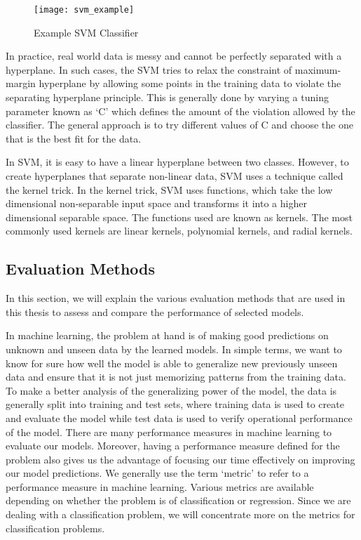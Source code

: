 \documentclass[11pt,openright]{report}
\begin{document}
  \begin{figure}
	\centering
	\texttt{[image: svm\_example]}
	\caption{Example SVM Classifier}
	\label{fig:svm_example}
\end{figure} 

In practice, real world data is messy and cannot be perfectly separated with a hyperplane. In such cases, the SVM tries to relax the constraint of maximum-margin hyperplane by allowing some points in the training data to violate the separating hyperplane principle. This is generally done by varying a tuning parameter known as `C' which defines the amount of the violation allowed by the classifier. The general approach is to try different values of C and choose the one that is the best fit for the data.

In SVM, it is easy to have a linear hyperplane between two classes. However, to create hyperplanes that separate non-linear data, SVM uses a technique called the kernel trick. In the kernel trick, SVM uses functions, which take the low dimensional non-separable input space and transforms it into a higher dimensional separable space. The functions used are known as kernels. The most commonly used kernels are linear kernels, polynomial kernels, and radial kernels. 

\subsection {Evaluation Methods}
In this section, we will explain the various evaluation methods that are used in this thesis to assess and compare the performance of selected models.

In machine learning, the problem at hand is of making good predictions on unknown and unseen data by the learned models. In simple terms, we want to know for sure how well the model is able to generalize new previously unseen data and ensure that it is not just memorizing patterns from the training data. To make a better analysis of the generalizing power of the model, the data is generally split into training and test sets, where training data is used to create and evaluate the model while test data is used to verify operational performance of the model. There are many performance measures in machine learning to evaluate our models. Moreover, having a performance measure defined for the problem also gives us the advantage of focusing our time effectively on improving our model predictions. We generally use the term `metric' to refer to a performance measure in machine learning. Various metrics are available depending on whether the problem is of classification or regression. Since we are dealing with a classification problem, we will concentrate more on the metrics for classification problems.
\end{document}
